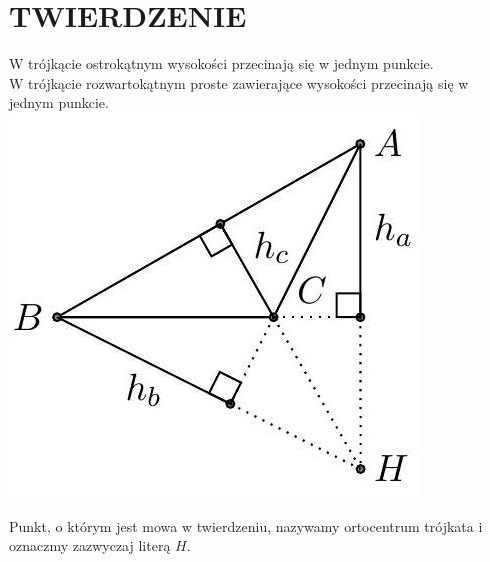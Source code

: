 \documentclass[10pt]{article}
\begin{document}
\section*{TWIERDZENIE}
W trójkącie ostrokątnym wysokości przecinają się w jednym punkcie.\\
W trójkącie rozwartokątnym proste zawierające wysokości przecinają się w jednym punkcie.\\
\includegraphics[max width=\textwidth, center]{2024_11_21_71f62bd117d375398909g-157}

Punkt, o którym jest mowa w twierdzeniu, nazywamy ortocentrum trójkata i oznaczmy zazwyczaj literą \(H\).
\end{document}
